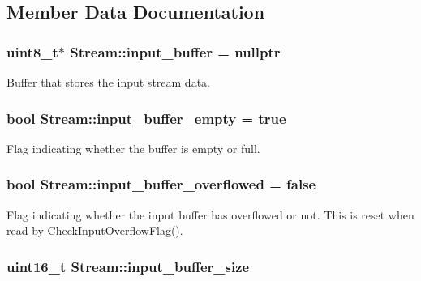 \subsection{Member Data Documentation}
\hypertarget{class_stream_a81139fc126566f9d42470fdb405ed26a}{
\subsubsection[{input\-\_\-buffer}]{\setlength{\rightskip}{0pt plus 5cm}uint8\-\_\-t$\ast$ Stream\-::input\-\_\-buffer = nullptr\hspace{0.3cm}{\ttfamily [protected]}}}\label{class_stream_a81139fc126566f9d42470fdb405ed26a}
Buffer that stores the input stream data. \hypertarget{class_stream_aff1c899af0d2dea35700d5665f378cd8}{
\subsubsection[{input\-\_\-buffer\-\_\-empty}]{\setlength{\rightskip}{0pt plus 5cm}bool Stream\-::input\-\_\-buffer\-\_\-empty = true\hspace{0.3cm}{\ttfamily [protected]}}}\label{class_stream_aff1c899af0d2dea35700d5665f378cd8}
Flag indicating whether the buffer is empty or full. \hypertarget{class_stream_ae7300cb8941cec142c14e8fc9baab9d3}{
\subsubsection[{input\-\_\-buffer\-\_\-overflowed}]{\setlength{\rightskip}{0pt plus 5cm}bool Stream\-::input\-\_\-buffer\-\_\-overflowed = false\hspace{0.3cm}{\ttfamily [protected]}}}\label{class_stream_ae7300cb8941cec142c14e8fc9baab9d3}
Flag indicating whether the input buffer has overflowed or not. This is reset when read by \hyperlink{class_stream_a088c4e68d568acfad715c56f408fe9f8}{Check\-Input\-Overflow\-Flag()}. \hypertarget{class_stream_a7373b1d6580a2d5dc74e788b3bb6a596}{
\subsubsection[{input\-\_\-buffer\-\_\-size}]{\setlength{\rightskip}{0pt plus 5cm}uint16\-\_\-t Stream\-::input\-\_\-buffer\-\_\-size\hspace{0.3cm}{\ttfamily [protected]}}}\label{class_stream_a7373b1d6580a2d5dc74e788b3bb6a596}
